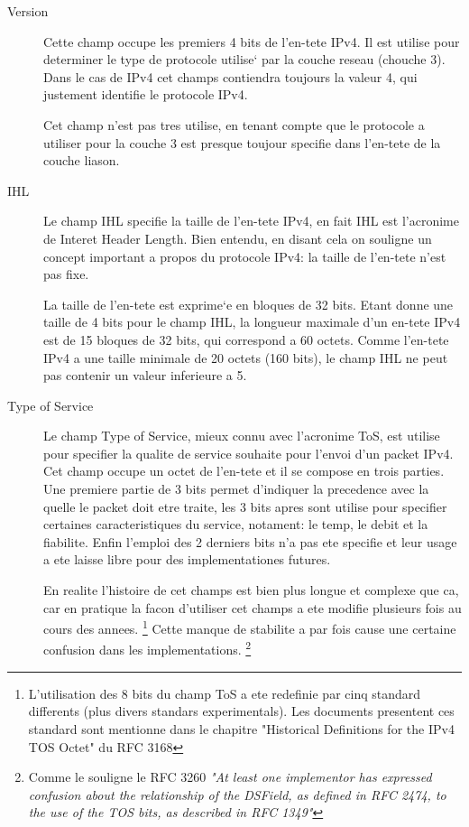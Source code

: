 \documentclass[twoside,openright,a4paper,11pt,french]{article}
\begin{document}
\begin{description}
\item [Version] 
Cette champ occupe les premiers 4 bits de l'en-tete IPv4. Il est
utilise pour determiner le type de protocole utilise` par la couche
reseau (chouche 3). Dans le cas de IPv4 cet champs contiendra toujours
la valeur 4, qui justement identifie le protocole IPv4.

Cet champ n'est pas tres utilise, en tenant compte que le protocole 
a utiliser pour la couche 3 est presque toujour specifie dans l'en-tete
de la couche liason.

\item [IHL]
Le champ IHL specifie la taille de l'en-tete IPv4, en fait IHL est 
l'acronime de Interet Header Length. Bien entendu, en disant cela on souligne
un concept important a propos du protocole IPv4: la taille de l'en-tete n'est pas fixe.

La taille de l'en-tete est exprime`e en bloques de 32 bits. Etant donne une taille de
4 bits pour le champ IHL, la longueur maximale d'un en-tete IPv4 est de 15 bloques de
32 bits, qui correspond a 60 octets. Comme l'en-tete IPv4 a une taille minimale
de 20 octets (160 bits), le champ IHL ne peut pas contenir un valeur inferieure a 5.

\item [Type of Service]
Le champ Type of Service, mieux connu avec l'acronime ToS, est utilise pour 
specifier la qualite de service souhaite pour l'envoi d'un packet IPv4.
Cet champ occupe un octet de l'en-tete et il se compose en trois parties.
Une premiere partie de 3 bits permet d'indiquer la precedence avec la quelle
le packet doit etre traite, les 3 bits apres sont utilise pour specifier 
certaines caracteristiques du service, notament: le temp, le debit et la fiabilite.
Enfin l'emploi des 2 derniers bits n'a pas ete specifie et leur usage a ete 
laisse libre pour des implementationes futures.


En realite l'histoire de cet champs est bien plus longue et complexe que ca,
car en pratique la facon d'utiliser cet champs a ete modifie plusieurs fois au 
cours des annees.
\footnote{L'utilisation des 8 bits du champ ToS a ete redefinie
par cinq standard differents (plus divers standars experimentals).
Les documents presentent ces standard sont mentionne dans le chapitre 
"Historical Definitions for the IPv4 TOS Octet" du RFC 3168}
Cette manque de stabilite a par fois cause une certaine confusion dans les implementations.
\footnote{Comme le souligne le RFC 3260 {\it "At least one implementor has expressed confusion about the
relationship of the DSField, as defined in RFC 2474, to the use of
the TOS bits, as described in RFC 1349"}}


\end{description}
\end{document}

